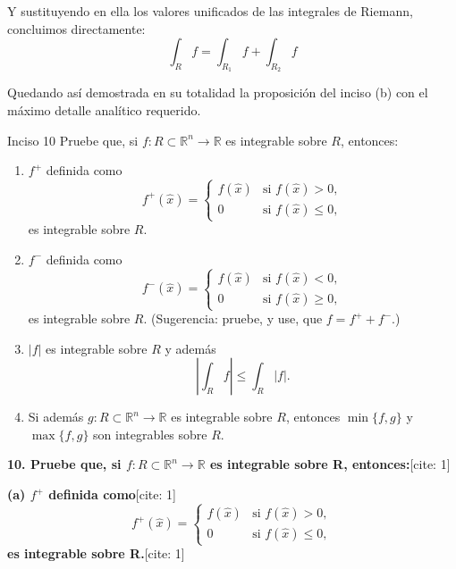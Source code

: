 \documentclass[11pt,letterpaper]{article}
\begin{document}
Y sustituyendo en ella los valores unificados de las integrales de Riemann, concluimos directamente:
\begin{equation*}
\int_{R}f = \int_{R_{1}}f + \int_{R_{2}}f
\end{equation*}

Quedando así demostrada en su totalidad la proposición del inciso (b) con el máximo detalle analítico requerido.

\begin{inciso}{Inciso 10}
Pruebe que, si $f:R\subset\mathbb{R}^{n}\rightarrow\mathbb{R}$ es integrable sobre $R$, entonces:
\begin{enumerate}[label=\alph*)]
    \item $f^{+}$ definida como
    \begin{equation*}
        f^{+}(\hat{x})=\begin{cases}
            f(\hat{x}) & \text{si } f(\hat{x})>0,\\ 
            0 & \text{si } f(\hat{x})\le 0,
        \end{cases}
    \end{equation*}
    es integrable sobre $R$.
    \item $f^{-}$ definida como
    \begin{equation*}
        f^{-}(\hat{x})=\begin{cases}
            f(\hat{x}) & \text{si } f(\hat{x})<0,\\ 
            0 & \text{si } f(\hat{x})\ge 0,
        \end{cases}
    \end{equation*}
    es integrable sobre $R$. (Sugerencia: pruebe, y use, que $f=f^{+}+f^{-}$.)
    \item $|f|$ es integrable sobre $R$ y además
    \begin{equation*}
        \left|\int_{R}f\right|\le\int_{R}|f|.
    \end{equation*}
    \item Si además $g:R\subset\mathbb{R}^{n}\rightarrow\mathbb{R}$ es integrable sobre $R$, entonces $\min\{f,g\}$ y $\max\{f,g\}$ son integrables sobre $R$.
\end{enumerate}
\end{inciso}

\textbf{10. Pruebe que, si $f:R\subset\mathbb{R}^{n}\rightarrow\mathbb{R}$ es integrable sobre R, entonces:}[cite: 1]

\textbf{(a) $f^{+}$ definida como}[cite: 1]
\begin{equation*}
f^{+}(\hat{x})=\begin{cases}f(\hat{x})&\text{si } f(\hat{x})>0,\\ 0&\text{si } f(\hat{x})\le0,\end{cases}
\end{equation*}
\textbf{es integrable sobre R.}[cite: 1]
\end{document}
